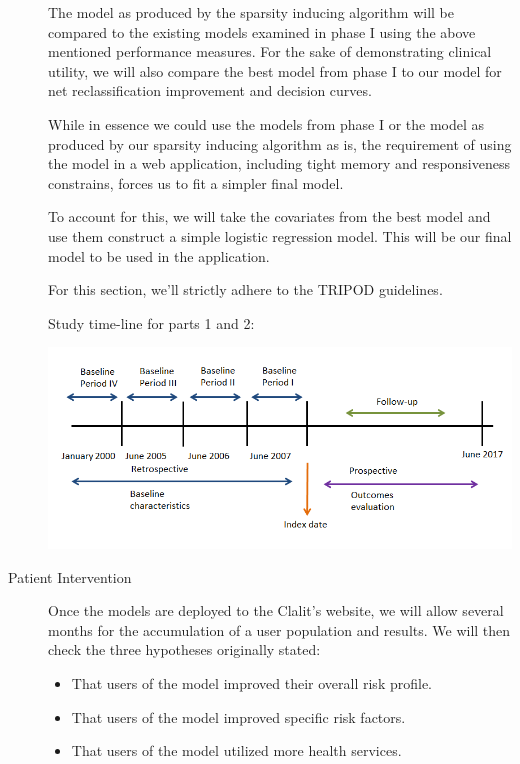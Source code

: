 \documentclass[a4paper,12pt]{article}
\begin{document}
\begin{description}
		The model as produced by the sparsity inducing algorithm will be compared to the existing models examined in phase I using the above mentioned performance measures. For the sake of demonstrating clinical utility, we will also compare the best model from phase I to our model for net reclassification improvement\cite{Pencina2008} and decision curves\cite{Vickers2016}.
		
		While in essence we could use the models from phase I or the model as produced by our sparsity inducing algorithm as is, the requirement of using the model in a web application, including tight memory and responsiveness constrains, forces us to fit a simpler final model.
		
		To account for this, we will take the covariates from the best model and use them construct a simple logistic regression model. This will be our final model to be used in the application.
		
		For this section, we'll strictly adhere to the TRIPOD guidelines\cite{Collins2015}.
		
		Study time-line for parts 1 and 2:
		
		\includegraphics[width=\textwidth]{prelim-results/Panpredictor/timeline.png}
		
		\item[Patient Intervention] Once the models are deployed to the Clalit's website, we will allow several months for the accumulation of a user population and results. We will then check the three hypotheses originally stated:
		
		\begin{itemize}
			\item That users of the model improved their overall risk profile.
			\item That users of the model improved specific risk factors.
			\item That users of the model utilized more health services.
		\end{itemize}
	

\end{description}
\end{document}
